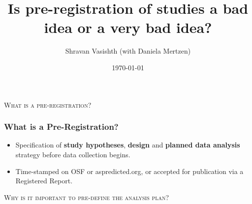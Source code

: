 \documentclass{beamer}
\title{Is pre-registration of studies a bad idea \newline or a very bad idea?}
\author{Shravan Vasishth (with Daniela Mertzen)}
\institute[Universität Potsdam] 
{
\medskip
}
\date{\today}
\begin{document}
\begin{frame}
\titlepage 
\end{frame}




\begin{frame}

\begin{center}
\begin{Large}
\textsc{What is a pre-registration?}
\end{Large}
\end{center}

\end{frame}


\begin{frame}
\frametitle{What is a Pre-Registration?}

\begin{itemize}
\item Specification of \textbf{study hypotheses}, \textbf{design} and \textbf{planned data analysis} strategy before data collection begins. 
\item  Time-stamped on OSF or aspredicted.org, or accepted for publication via a Registered Report.
\end{itemize}


\end{frame}




\begin{frame}

\begin{center}
\begin{Large}
\textsc{Why is it important to pre-define the analysis plan?}
\end{Large}
\end{center}

\end{frame}

\end{document}
